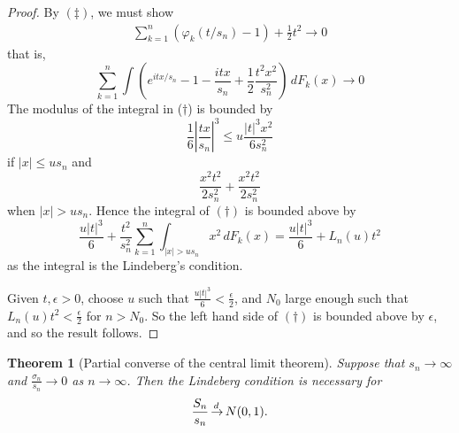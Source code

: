 \documentclass[10pt, oneside, reqno]{amsart}
\theoremstyle{plain}%
\newtheorem{thm}{Theorem}[section]
\theoremstyle{definition}
\theoremstyle{remark}
\renewcommand{\phi}{\varphi}
\def\cid{\,{\buildrel \!d \over \rightarrow}\,}
\begin{document}
\begin{proof}
	By $(\ddag)$, we must show \begin{align*}
		\sum_{k=1}^n (\phi_k(t/s_n) - 1) + \frac{1}{2} t^2 \rightarrow 0
	\end{align*} that is, \[
		\sum_{k=1}^n \int \left( e^{itx/s_n} - 1 - \frac{itx}{s_n} + \frac{1}{2} \frac{t^2 x^2}{s_n^2} \right)\, dF_k(x) \rightarrow 0  \tag{$\dagger$}
	\]  The modulus of the integral in ($\dagger$) is bounded by \[
		\frac{1}{6} \left|\frac{tx}{s_n} \right|^3 \leq u \frac{|t|^3 x^2}{6s_n^2}
	\] if $|x| \leq u s_n$ and \[
		\frac{x^2 t^2}{2s_n^2} + \frac{x^2 t^2}{2s_n^2}
	\] when $|x| > u s_n$.  Hence the integral of $(\dagger)$ is bounded above by \[
		\frac{u|t|^3}{6} + \frac{t^2}{s_n^2} \sum_{k=1}^n \int_{|x| > u s_n} x^2 \, dF_k(x) = \frac{u |t|^3}{6} + L_n(u) t^2
	\] as the integral is the Lindeberg's condition.  
	
	Given $t, \epsilon > 0$, choose $u$ such that $\frac{u |t|^3}{6} < \frac{\epsilon}{2}$, and $N_0$ large enough such that $L_n(u) t^2 < \frac{\epsilon}{2}$ for $n > N_0$.  So the left hand side of $(\dagger)$ is bounded above by $\epsilon$, and so the result follows.  
\end{proof}

\begin{thm}[Partial converse of the central limit theorem]
	Suppose that $s_n \rightarrow \infty$ and $\frac{\sigma_n}{s_n} \rightarrow 0$ as $n \rightarrow \infty$.  Then the Lindeberg condition is necessary for \[
		\frac{S_n}{s_n} \cid N(0, 1).
	\]
\end{thm}
\end{document}
